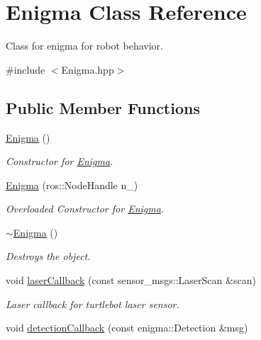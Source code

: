 \hypertarget{class_enigma}{}\section{Enigma Class Reference}
\label{class_enigma}


Class for enigma for robot behavior.  




{\ttfamily \#include $<$Enigma.\+hpp$>$}

\subsection*{Public Member Functions}
\begin{DoxyCompactItemize}
\item 
\mbox{\label{class_enigma_acae81b22dbb4a98e7f3e7743f3564d0e}} 
\hyperlink{class_enigma_acae81b22dbb4a98e7f3e7743f3564d0e}{Enigma} ()
\begin{DoxyCompactList}\small\item\em Constructor for \hyperlink{class_enigma}{Enigma}. \end{DoxyCompactList}\item 
\hyperlink{class_enigma_a10f3e8731f96cb675c04cdac4dfb978a}{Enigma} (ros\+::\+Node\+Handle n\+\_\+)
\begin{DoxyCompactList}\small\item\em Overloaded Constructor for \hyperlink{class_enigma}{Enigma}. \end{DoxyCompactList}\item 
\mbox{\label{class_enigma_ae4d3772430a6dc15583ae913f3d65770}} 
\hyperlink{class_enigma_ae4d3772430a6dc15583ae913f3d65770}{$\sim$\+Enigma} ()
\begin{DoxyCompactList}\small\item\em Destroys the object. \end{DoxyCompactList}\item 
void \hyperlink{class_enigma_a4b60ea0e93d9076e83d75ff3cfbe6fc3}{laser\+Callback} (const sensor\+\_\+msgs\+::\+Laser\+Scan \&scan)
\begin{DoxyCompactList}\small\item\em Laser callback for turtlebot laser sensor. \end{DoxyCompactList}\item 
void \hyperlink{class_enigma_a468f2a08dbf08c32b055b0c3bae63dc7}{detection\+Callback} (const enigma\+::\+Detection \&msg)

\end{DoxyCompactItemize}

